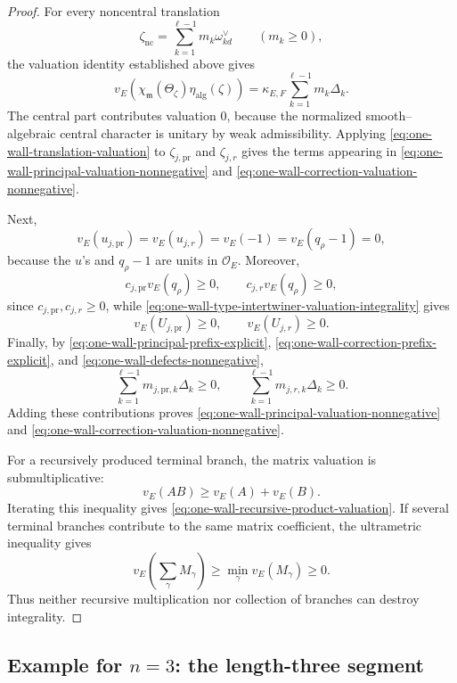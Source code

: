 \documentclass[12pt]{article}
\theoremstyle{definition}
\theoremstyle{remark}
\newcommand{\Ocoeff}{\mathcal O_E}
\begin{document}
\begin{proof}
For every noncentral translation
\[
 \zeta_{\mathrm{nc}}
 =
 \sum_{k=1}^{\ell-1}m_k\omega_{kd}^\vee
 \qquad(m_k\geq0),
\]
the valuation identity established above gives
\begin{equation}\label{eq:one-wall-translation-valuation}
 v_E\!\left(
 \chi_{\mathfrak m}(\Theta_\zeta)
 \eta_{\mathrm{alg}}(\zeta)
 \right)
 =
 \kappa_{E,F}
 \sum_{k=1}^{\ell-1}m_k\Delta_k.
\end{equation}
The central part contributes valuation \(0\), because the normalized
smooth--algebraic central character is unitary by weak admissibility.
Applying \eqref{eq:one-wall-translation-valuation} to
\(\zeta_{j,\mathrm{pr}}\) and \(\zeta_{j,r}\) gives the terms appearing
in \eqref{eq:one-wall-principal-valuation-nonnegative} and
\eqref{eq:one-wall-correction-valuation-nonnegative}.

Next,
\[
 v_E(u_{j,\mathrm{pr}})
 =
 v_E(u_{j,r})
 =
 v_E(-1)
 =
 v_E(q_\rho-1)
 =
 0,
\]
because the \(u\)'s and \(q_\rho-1\) are units in \(\Ocoeff\).  Moreover,
\[
 c_{j,\mathrm{pr}}v_E(q_\rho)\geq0,
 \qquad
 c_{j,r}v_E(q_\rho)\geq0,
\]
since \(c_{j,\mathrm{pr}},c_{j,r}\geq0\), while
\eqref{eq:one-wall-type-intertwiner-valuation-integrality} gives
\[
 v_E(U_{j,\mathrm{pr}})\geq0,
 \qquad
 v_E(U_{j,r})\geq0.
\]
Finally, by
\eqref{eq:one-wall-principal-prefix-explicit},
\eqref{eq:one-wall-correction-prefix-explicit}, and
\eqref{eq:one-wall-defects-nonnegative},
\[
 \sum_{k=1}^{\ell-1}
 m_{j,\mathrm{pr},k}\Delta_k\geq0,
 \qquad
 \sum_{k=1}^{\ell-1}
 m_{j,r,k}\Delta_k\geq0.
\]
Adding these contributions proves
\eqref{eq:one-wall-principal-valuation-nonnegative} and
\eqref{eq:one-wall-correction-valuation-nonnegative}.

For a recursively produced terminal branch, the matrix valuation is
submultiplicative:
\[
 v_E(AB)\geq v_E(A)+v_E(B).
\]
Iterating this inequality gives
\eqref{eq:one-wall-recursive-product-valuation}.  If several terminal
branches contribute to the same matrix coefficient, the ultrametric
inequality gives
\[
 v_E\!\left(\sum_\gamma M_\gamma\right)
 \geq
 \min_\gamma v_E(M_\gamma)
 \geq0.
\]
Thus neither recursive multiplication nor collection of branches can
destroy integrality.
\end{proof}


\subsection{Example for \texorpdfstring{$n=3$}{n=3}: the length-three segment}
\end{document}
